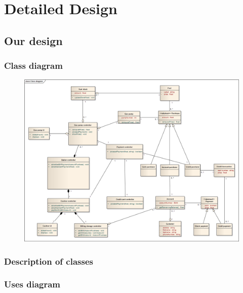\section{Detailed Design}
\subsection{Our design}
\subsubsection{Class diagram}

\begin{figure}[H]
 \centering
 \includegraphics[width=\textwidth]{../ClassDiagram.png}
\end{figure}

\subsubsection{Description of classes}



\subsubsection{Uses diagram}

